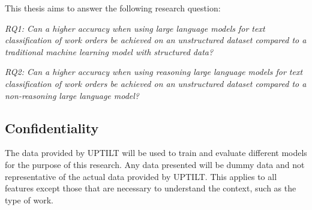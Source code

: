This thesis aims to answer the following research question:

\bigskip
\textit{RQ1: Can a higher accuracy when using large language models for
    text classification of work orders be achieved on an unstructured dataset
    compared to a traditional machine learning model with structured data?}

\bigskip
\textit{RQ2: Can a higher accuracy when using reasoning large language models for
    text classification of work orders be achieved on an unstructured dataset
    compared to a non-reasoning large language model?}

\subsection{Confidentiality}

The data provided by UPTILT will be used to train and evaluate different models
for the purpose of this research. Any data presented will be dummy data and not
representative of the actual data provided by UPTILT. This applies to all
features except those that are necessary to understand the context, such as the
type of work.
